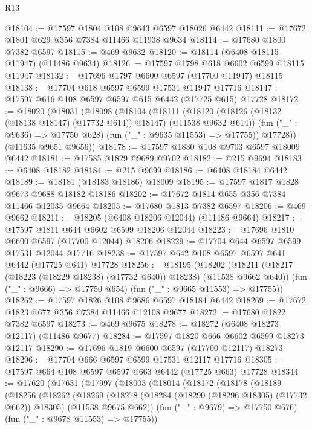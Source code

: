 \begin{lexlean}{R13}
\begin{coremodule}
@18104 := @17597 @1804 @108 @9643 @6597 @18026 @6442
@18111 := @17672 @1801 @629 @356 @7384 @11466 @11938 @9634
@18114 := @17680 @1800 @7382 @6597
@18115 := @469 @9632
@18120 := @18114 (@6408 @18115 @11947) (@11486 @9634)
@18126 := @17597 @1798 @618 @6602 @6599 @18115 @11947
@18132 := @17696 @1797 @6600 @6597 (@17700 @11947) @18115
@18138 := @17704 @618 @6597 @6599 @17531 @11947 @17716
@18147 := @17597 @616 @108 @6597 @6597 @615 @6442 (@17725 @615) @17728
@18172 := @18020
    (@18031
      (@18098
        (@18104
          (@18111
            (@18120 (@18126 (@18132 (@18138 @18147) (@17732 @614)) @18147) (@11538 @9632 @614))
            (fun ("_" : @9636) => @17750 @628)
            (fun ("_" : @9635 @11553) => @17755))
          @17728))
      (@11635 @9651 @9656))
@18178 := @17597 @1830 @108 @9703 @6597 @18009 @6442
@18181 := @17585 @1829 @9689 @9702
@18182 := @215 @9694
@18183 := @6408 @18182
@18184 := @215 @9699
@18186 := @6408 @18184 @6442
@18189 := @18181 (@18183 @18186) @18009
@18195 := @17597 @1817 @1828 @9673 @9688 @18182 @18186
@18202 := @17672 @1814 @655 @356 @7384 @11466 @12035 @9664
@18205 := @17680 @1813 @7382 @6597
@18206 := @469 @9662
@18211 := @18205 (@6408 @18206 @12044) (@11486 @9664)
@18217 := @17597 @1811 @644 @6602 @6599 @18206 @12044
@18223 := @17696 @1810 @6600 @6597 (@17700 @12044) @18206
@18229 := @17704 @644 @6597 @6599 @17531 @12044 @17716
@18238 := @17597 @642 @108 @6597 @6597 @641 @6442 (@17725 @641) @17728
@18256 := @18195
    (@18202
      (@18211 (@18217 (@18223 (@18229 @18238) (@17732 @640)) @18238) (@11538 @9662 @640))
      (fun ("_" : @9666) => @17750 @654)
      (fun ("_" : @9665 @11553) => @17755))
@18262 := @17597 @1826 @108 @9686 @6597 @18184 @6442
@18269 := @17672 @1823 @677 @356 @7384 @11466 @12108 @9677
@18272 := @17680 @1822 @7382 @6597
@18273 := @469 @9675
@18278 := @18272 (@6408 @18273 @12117) (@11486 @9677)
@18284 := @17597 @1820 @666 @6602 @6599 @18273 @12117
@18290 := @17696 @1819 @6600 @6597 (@17700 @12117) @18273
@18296 := @17704 @666 @6597 @6599 @17531 @12117 @17716
@18305 := @17597 @664 @108 @6597 @6597 @663 @6442 (@17725 @663) @17728
@18344 := @17620
    (@17631
      (@17997
        (@18003
          (@18014
            (@18172
              (@18178
                (@18189
                  (@18256
                    (@18262
                      (@18269
                        (@18278
                          (@18284 (@18290 (@18296 @18305) (@17732 @662)) @18305)
                          (@11538 @9675 @662))
                        (fun ("_" : @9679) => @17750 @676)
                        (fun ("_" : @9678 @11553) => @17755))

\end{coremodule}
\end{lexlean}
